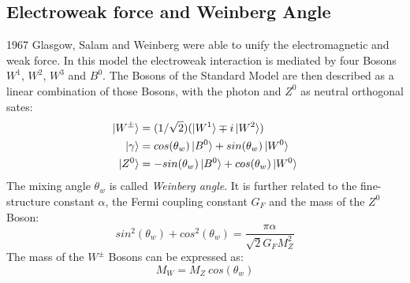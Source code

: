 \subsection{Electroweak force and Weinberg Angle}
1967 Glasgow, Salam and Weinberg were able to unify the electromagnetic and weak force. In this model the electroweak interaction is mediated by four Bosons $W^1$, $W^2$, $W^3$ and $B^0$. The Bosons of the Standard Model are then described as a linear combination of those Bosons, with the photon and $Z^0$ as  neutral orthogonal sates\cite{Grif}:
\begin{equation}
\begin{aligned}
\ket{W^{\pm}}&=(1/\sqrt{2}) (\ket{W^1}\mp i\ket{W^2})\\
\ket{\gamma} &=  cos(\theta_w)\ket{B^0} + sin(\theta_w) \ket{W^0}\\
\ket{Z^0} &= -sin(\theta_w) \ket{B^0} + cos(\theta_w) \ket{W^0}
\end{aligned}
\end{equation}
The mixing angle $\theta_w$ is called \emph{Weinberg angle}. It is further related to the fine-structure constant  $\alpha$, the Fermi coupling constant $G_F$ and the mass of the $Z^0$ Boson\cite{muenchen}:
\begin{equation}
sin^2(\theta_w)+cos^2(\theta_w) = \frac{\pi\alpha}{\sqrt{2}G_FM_Z^2}
\end{equation}
The mass of the $W^{\pm}$ Bosons can be expressed as:
\begin{equation}
M_W = M_Z~cos(\theta_w)
\end{equation}

